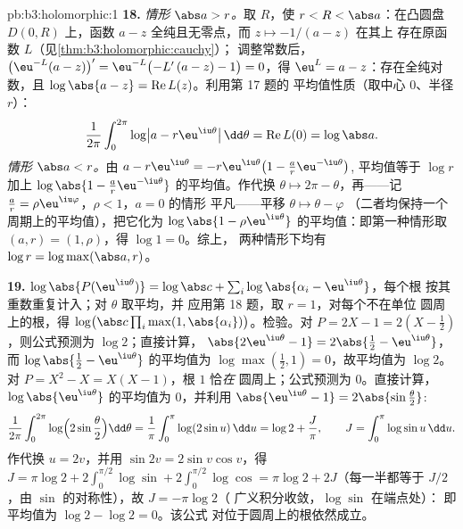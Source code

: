 \begin{solution}{pb:b3:holomorphic:1}
\textbf{18.} \emph{情形 $\abs a > r$。}取 $R$，使 $r < R
< \abs a$：在凸圆盘 $D(0, R)$ 上，函数 $a - z$
全纯且无零点，而 $z \mapsto -1/(a - z)$ 在其上
存在原函数 $L$（见\cref{thm:b3:holomorphic:cauchy}）；
调整常数后，$\bigl(\eu^{-L}(a -
z)\bigr)' = \eu^{-L}\bigl(-L'\,(a - z) - 1\bigr) = 0$，得
$\eu^L = a - z$：存在全纯对数，且
$\log\abs{a - z} = \operatorname{Re}L(z)$。利用第 17 题的
平均值性质（取中心 $0$、半径 $r$）：
\[
\frac1{2\pi}\int_0^{2\pi}
\log\bigl|a - r\eu^{\iu\theta}\bigr|\,\dd\theta
= \operatorname{Re}L(0) = \log\abs a .
\]
\emph{情形 $\abs a < r$。}由 $a - r\eu^{\iu\theta} =
-r\eu^{\iu\theta}\bigl(1 - \frac ar\eu^{-\iu\theta}\bigr)$,
平均值等于 $\log r$ 加上 $\log\abs{1 -
\frac ar\eu^{-\iu\theta}}$ 的平均值。作代换 $\theta \mapsto
2\pi - \theta$，再——记 $\frac ar =
\rho\eu^{\iu\varphi}$，$\rho < 1$，$a = 0$ 的情形
平凡——平移 $\theta \mapsto \theta - \varphi$
（二者均保持一个周期上的平均值），把它化为
$\log\abs{1 - \rho\eu^{\iu\theta}}$ 的平均值：即第一种情形取
$(a, r) = (1, \rho)$，得 $\log 1 = 0$。综上，
两种情形下均有 $\log r = \log\max(\abs a, r)$。

\textbf{19.} $\log\abs{P(\eu^{\iu\theta})} = \log\abs c +
\sum_i\log\abs{\alpha_i - \eu^{\iu\theta}}$，每个根
按其重数重复计入；对 $\theta$ 取平均，并
应用第 18 题，取 $r = 1$，对每个不在单位
圆周上的根，得 $\log\bigl(\abs c\prod_i\max(1,
\abs{\alpha_i})\bigr)$。检验。对 $P = 2X - 1 = 2(X -
\frac12)$，则公式预测为 $\log 2$；直接计算，
$\abs{2\eu^{\iu\theta} - 1} = 2\abs{\frac12 -
\eu^{\iu\theta}}$，而 $\log\abs{\frac12 -
\eu^{\iu\theta}}$ 的平均值为 $\log\max(\frac12, 1) = 0$，故平均值为 $\log
2$。对 $P = X^2 - X = X(X - 1)$，根 $1$ 恰\emph{在}
圆周上；公式预测为 $0$。直接计算，
$\log\abs{\eu^{\iu\theta}}$ 的平均值为 $0$，并利用
$\abs{\eu^{\iu\theta} - 1} = 2\abs{\sin\frac\theta2}$:
\[
\frac1{2\pi}\int_0^{2\pi}
\log\Bigl(2\sin\frac\theta2\Bigr)\dd\theta
= \frac1\pi\int_0^\pi\log(2\sin u)\,\dd u
= \log 2 + \frac J\pi,
\qquad J = \int_0^\pi\log\sin u\,\dd u .
\]
作代换 $u = 2v$，并用 $\sin 2v = 2\sin v\cos v$，得
$J = \pi\log2 + 2\int_0^{\pi/2}\log\sin +
2\int_0^{\pi/2}\log\cos = \pi\log 2 + 2J$（每一半都等于
$J/2$，由 $\sin$ 的对称性），故 $J = -\pi\log 2$（
广义积分收敛，$\log\sin$ 在端点处）：
即平均值为 $\log2 - \log2 = 0$。该公式
对位于圆周上的根依然成立。


\end{solution}
